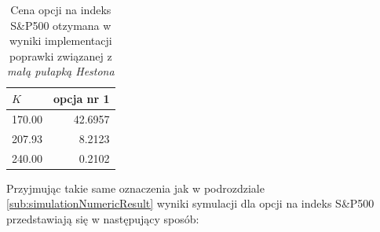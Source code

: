\documentclass{pracamgr}
\begin{document}
\begin{table}[ht!]
\centering 
\begin{tabular}{@{\hskip 0.5in}l |  @{\hskip 0.5in}r }
\toprule
$K$ & opcja nr 1 \\
\midrule
170.00 & 42.6957 \\
207.93 & 8.2123 \\
240.00 & 0.2102 \\
\bottomrule
\end{tabular}
\caption{Cena opcji na indeks S\&P500 otzymana w wyniki implementacji 
         poprawki związanej z \textit{małą pułapką Hestona}}
\label{tab:littleTrapOption2}
\end{table}
Przyjmując takie same oznaczenia jak w podrozdziale 
\ref{sub:simulationNumericResult} wyniki symulacji dla opcji na indeks 
S\&P500 przedstawiają się w następujący sposób:
\end{document}
